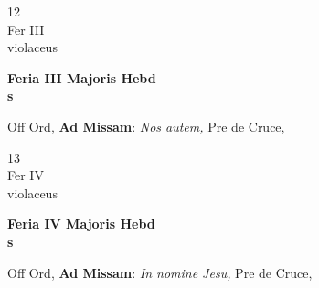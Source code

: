 \documentclass[10pt, openany]{book}
\begin{document}
        \begin{center}
            \begin{minipage}{3.5in}
                \vspace{2em}
                \begin{minipage}{0.5in}
                    {\Huge 12} \\
                    {\normalsize Fer III} \\
                    {\normalsize violaceus}
                \end{minipage}
                \begin{minipage}{3.0in}
                    \textbf{ \large Feria III Majoris Hebd \\
                    \textnormal{\normalsize s}} \\ 
                \end{minipage}
                \begin{justify}Off Ord, \textbf{Ad Missam}: \textit{Nos autem,} Pre de Cruce,   
                \end{justify}
            \end{minipage}
        \end{center}
    
        \begin{center}
            \begin{minipage}{3.5in}
                \vspace{2em}
                \begin{minipage}{0.5in}
                    {\Huge 13} \\
                    {\normalsize Fer IV} \\
                    {\normalsize violaceus}
                \end{minipage}
                \begin{minipage}{3.0in}
                    \textbf{ \large Feria IV Majoris Hebd \\
                    \textnormal{\normalsize s}} \\ 
                \end{minipage}
                \begin{justify}Off Ord, \textbf{Ad Missam}: \textit{In nomine Jesu,} Pre de Cruce,   
                \end{justify}
            \end{minipage}
        \end{center}
    
\end{document}
